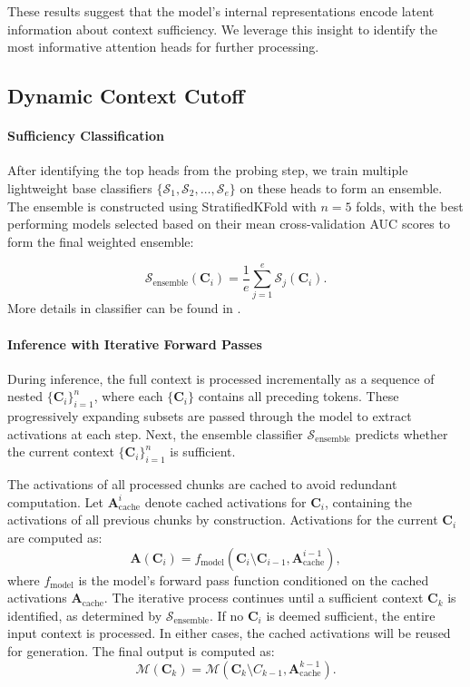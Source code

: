 These results suggest that the model's internal representations encode latent information about context sufficiency. We leverage this insight to identify the most informative attention heads for further processing.


\subsection{Dynamic Context Cutoff}
\paragraph{Sufficiency Classification}
After identifying the top heads from the probing step, we train multiple lightweight base classifiers \(\{\mathcal{S}_1, \mathcal{S}_2, \ldots, \mathcal{S}_e\}\) on these heads to form an ensemble. The ensemble is constructed using StratifiedKFold with $n=5$ folds, with the best performing models selected based on their mean cross-validation AUC scores to form the final weighted ensemble:

\[
\mathcal{S}_{\text{ensemble}}(\mathbf{C}_i) = \frac{1}{e} \sum_{j=1}^e \mathcal{S}_j(\mathbf{C}_i).
\]
More details in classifier can be found in . 

\paragraph{Inference with Iterative Forward Passes}
During inference, the full context is processed incrementally as a sequence of nested \(\{\mathbf{C}_i\}_{i=1}^n\), where each \(\{\mathbf{C}_i\}\) contains all preceding tokens. These progressively expanding subsets are passed through the model to extract activations at each step. Next, the ensemble classifier \(\mathcal{S}_{\text{ensemble}}\) predicts whether the current context \(\{\mathbf{C}_i\}_{i=1}^n\) is sufficient.

The activations of all processed chunks are cached to avoid redundant computation. Let \(\mathbf{A}_{\text{cache}}^{i}\) denote cached activations for \(\mathbf{C}_i\), containing the activations of all previous chunks by construction. Activations for the current \(\mathbf{C}_i\) are computed as:
\[\mathbf{A}(\mathbf{C}_i) = f_{\text{model}}(\mathbf{C}_i \setminus \mathbf{C}_{i-1}, \mathbf{A}_{\text{cache}}^{i-1}),\]
where \(f_{\text{model}}\) is the model's forward pass function conditioned on the cached activations \(\mathbf{A}_{\text{cache}}\). 
The iterative process continues until a sufficient context $\mathbf{C}_k$ is identified, as determined by \(\mathcal{S}_{\text{ensemble}}\). If no $\mathbf{C}_i$ is deemed sufficient, the entire input context is processed. In either cases, the cached activations will be reused for generation. The final output is computed as:
\[
\mathcal{M}(\mathbf{C}_k) = \mathcal{M}(\mathbf{C}_k \setminus C_{k-1}, \mathbf{A}_{\text{cache}}^{k-1}).
\]

